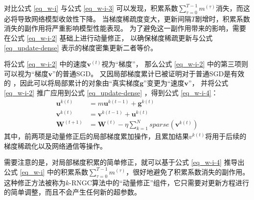 \documentclass{xdupgthesis}
\begin{document}
对比公式 \eqref{eq_w-i} 与公式 \eqref{eq_w-i-3} 可以发现，积累系数$\sum_{\tau=0}^{T-1}m^{(\tau)}$消失，而这必将导致网络模型收敛性下降。
当梯度稀疏度变大，更新间隔$T$剧增时，积累系数消失的副作用将严重影响模型性能表现。
为了避免这一副作用带来的影响，需要在公式 \eqref{eq_w-i-2} 基础上进行动量修正，
以确保梯度稀疏更新与公式 \eqref{eq_update-dense} 表示的梯度密集更新二者等价。

将公式 \eqref{eq_w-i-2} 中的速度$\mathbf{v}^{(t)}$视为“梯度”，
那么公式 \eqref{eq_w-i-2} 中的第三项则可以视为“梯度$\mathbf{v}$”的普通SGD。
又因局部梯度累计已被证明对于普通SGD是有效的 \cite{lin2017deep}，因此可以将局部累计的对象由“真实梯度$\mathbf{g}$”变更为“速度$\mathbf{v}$”，
并将公式 \eqref{eq_w-i-2} 推广应用到公式 \eqref{eq_update-dense} ，得到公式 \eqref{eq_w-i-4}：
\begin{equation}
    \begin{aligned}
        \mathbf{u}^{k(t)} &= m\mathbf{u}^{k(t - 1)} + \mathbf{g}^{k(t)} \\
        \mathbf{v}^{k(t)} &= \mathbf{v}^{k(t - 1)} + \mathbf{u}^{k(t)} \\
        \mathbf{W}^{(t+1)} &= \mathbf{W}^{(t)} - \eta\sum_{k = 1}^{N} sparse\left( \mathbf{v}^{k(t)} \right)
    \end{aligned}
    \label{eq_w-i-4}
\end{equation}
其中，前两项是动量修正后的局部梯度累加操作，且累加结果$v^{k(t)}$将用于后续的梯度稀疏化以及网络通信等操作。

需要注意的是，对局部梯度积累的简单修正，就可以基于公式 \eqref{eq_w-i-4} 推导出公式 \eqref{eq_w-i} 中的积累系数$\sum_{\tau=0}^{T-1}m^{(\tau)}$，很好地避免了积累系数消失的副作用。
这种修正方法被称为$k$-RNGC算法中的“动量修正”组件，它只需要对更新方程进行的简单调整，而且不会产生任何新的超参数。
\end{document}
